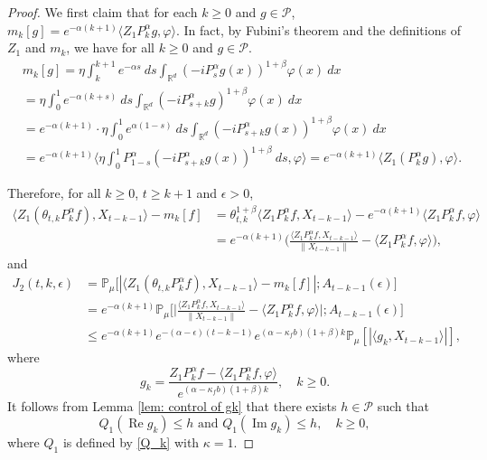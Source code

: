 \documentclass[12pt,a4paper]{amsart}
\theoremstyle{plain}
\theoremstyle{definition}
\numberwithin{equation}{section}
\begin{document}
\begin{proof}
 We first claim that for each $k\geq0$ and $g\in \mathcal P$, $m_k[g]=e^{-\alpha(k+1)}\langle Z_1P_k^{\alpha}g, \varphi \rangle$. 
In fact, by Fubini's theorem and the definitions of $Z_1$ and $m_k$, we have for all $k\geq 0$ and $g\in \mathcal P$.
\begin{align}
	&m_k[g]
        = \eta \int_k^{k+1}e^{-\alpha s}~ds\int_{\mathbb R^d} (-iP_{s}^\alpha g(x))^{1+\beta} \varphi(x)~dx\\
       &=\eta \int_0^1e^{-\alpha (k+s)}~ds\int_{\mathbb R^d} (-iP_{s+k}^\alpha g)^{1+\beta}\varphi(x)~dx\\
       &=e^{-\alpha(k+1)} \cdot \eta \int_0^{1}e^{\alpha(1- s)}~ds\int_{\mathbb R^d} (-iP_{s+k}^\alpha        g(x))^{1+\beta} \varphi(x)~dx\\
      &=e^{-\alpha(k+1)}\langle \eta \int_0^1P_{1-s}^{\alpha}(-iP_{s+k}^\alpha g(x))^{1+\beta}~ds, \varphi \rangle
      =e^{-\alpha(k+1)}\langle Z_1(P_k^{\alpha}g), \varphi \rangle.
\end{align}

Therefore, for all $k\geq 0$, $t\geq k+1$ and $\epsilon> 0$,
\begin{align}
    \langle Z_1(\theta_{t,k}P^\alpha_k f),X_{t-k-1}\rangle-m_k[f]
    &= \theta_{t,k}^{1+\beta} \langle Z_1P^\alpha_k f,X_{t-k-1}\rangle - e^{-\alpha (k+1)}\langle  Z_1P^\alpha_k f,\varphi\rangle
    \\&=e^{-\alpha (k+1)}\Big(\frac{\langle Z_1P^\alpha_k f ,X_{t-k-1}\rangle}{\|X_{t-k-1}\|}-\langle  Z_1P^\alpha_k f ,\varphi\rangle\Big),
\end{align}
and
\begin{align}
\label{eq: prevJ2}
    J_2(t,k,\epsilon)&
    = \mathbb P_\mu\big[|\langle Z_1(\theta_{t,k}P^\alpha_k f),X_{t-k-1}\rangle-m_k[f]|;A_{t-k-1}(\epsilon)\big]
    \\&=e^{-\alpha( k+1)}\mathbb{P}_{\mu}\bigg[\Big|\frac{\langle Z_1P^{\alpha}_k f,X_{t-k-1}\rangle}{\|X_{t-k-1}\|}-\langle  Z_1P^{\alpha}_k f,\varphi\rangle\Big|;A_{t-k-1}(\epsilon)\bigg]\nonumber\\
    &\leq e^{-\alpha (k+1)}e^{-(\alpha-\epsilon)(t-k-1)}e^{(\alpha-\kappa_f b)(1+\beta)k} \mathbb{P}_{\mu}\left[\left|\langle g_k,X_{t-k-1}\rangle\right|\right],
\end{align}
where
\[
    g_k
    = \frac{Z_1 P^{\alpha}_k f-\langle  Z_1P^{\alpha}_k f,\varphi\rangle}{e^{(\alpha-\kappa_f b)(1+\beta)k}},
    \quad k \geq 0.
\]
    It follows from Lemma \ref{lem: control of gk} that there exists $h\in \mathcal{P}$ such that
 \[
    Q_1 (\operatorname{Re} g_k) \leq h
    \text{ and } Q_1 (\operatorname{Im} g_k)\leq h,
    \quad k \geq 0,
 \]
    where $Q_1$ is defined by \eqref{Q_k} with $\kappa=1$.


\end{proof}
\end{document}
